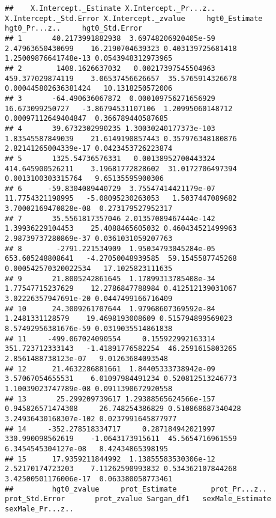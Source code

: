 \documentclass[
]{book}
\begin{document}
\begin{verbatim}
##    X.Intercept._Estimate X.Intercept._Pr...z.. X.Intercept._Std.Error X.Intercept._zvalue     hgt0_Estimate         hgt0_Pr...z..     hgt0_Std.Error
## 1       40.2173991882938  3.69748206920405e-59       2.47963650430699    16.2190704639323 0.403139725681418  1.25009876641748e-13 0.0543948312973965
## 2        1408.1626637032   0.00217397545504963       459.377029874119    3.06537456626657  35.5765914326678  0.000445802636381424   10.1318250572006
## 3       -64.490636067872  0.000109756271656929        16.673099250727   -3.86794531107106  1.20995060148712   0.00097112649404847  0.366789440587685
## 4       39.6732302990235 1.30030240177373e-103       1.83545587849039    21.6149190857443 0.357976348180876  2.82141265004339e-17 0.0423453726223874
## 5       1325.54736576331   0.00138952700443324       414.645900526211    3.19681772828602  31.0172706497394    0.0013100303315764   9.65135595900306
## 6      -59.8304089440729  3.75547414421179e-07       11.7754321198995   -5.08095230263053   1.5037447089682  3.70002169470828e-08  0.273179527952317
## 7       35.5561817357046 2.01357089467444e-142       1.39936229104453    25.4088465605032 0.460434521499963  2.98739737280869e-37 0.0361031059207763
## 8        -2791.221534909  1.95034793045284e-05       653.605248808641   -4.27050048939585  59.1545587745268  0.000542570320022534   17.1025823111635
## 9       21.8005242861645  1.17899313785408e-34       1.77547715237629    12.2786847788984 0.412512139031067  3.02226357947691e-20 0.0447499166716409
## 10      24.3009261707644  1.97968607369592e-84        1.2481331128579    19.4698193008609 0.515794899569023  8.57492956381676e-59 0.0319035514861838
## 11     -499.067024090554     0.155922992163314       351.723712333143   -1.41891776582254  46.2591615803265   2.8561488738123e-07   9.01263684093548
## 12      21.4632286881661  1.84405333738942e-09       3.57067054655531    6.01097984491234 0.520812513246773  1.10039023747789e-08 0.0911390672920558
## 13       25.299209739617 1.29388565624566e-157      0.945826571474308     26.748254386829 0.510868687340428 3.24936430168307e-102 0.0237991645877977
## 14     -352.278518334717     0.287184942021997       330.990098562619    -1.0643173915611  45.5654716961559   6.3454545304127e-08   8.42434865398195
## 15      17.9359211844992  1.13855583530306e-12       2.52170174723203    7.11262590993832 0.534362107844268  3.42500501176006e-17  0.063380058773461
##         hgt0_zvalue     prot_Estimate        prot_Pr...z..     prot_Std.Error       prot_zvalue Sargan_df1   sexMale_Estimate     sexMale_Pr...z..

\end{verbatim}
\end{document}
